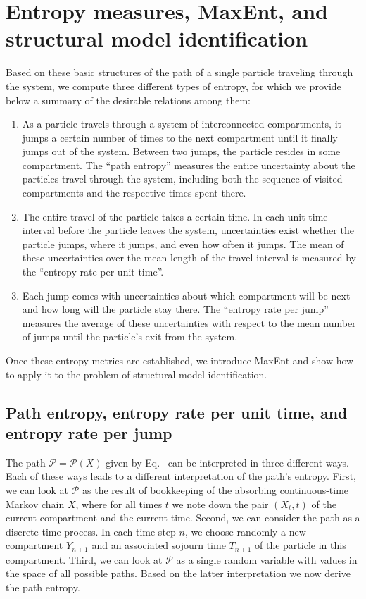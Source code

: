 \documentclass[smallextended]{svjour3}
\makeatletter
\renewcommand*{\eqref}[1]{%
  \hyperref[{#1}]{\textup{\tagform@{\ref*{#1}}}}%
}
\renewcommand{\emph}[1]{``#1''}
\makeatother
\begin{document}
\section{Entropy measures, MaxEnt, and structural model identification}
Based on these basic structures of the path of a single particle traveling through the system, we compute three different types of entropy, for which we provide below
a summary of the desirable relations among them:
\begin{enumerate}[(1)]
  \item 	As a particle travels through a system of interconnected compartments, it jumps a certain number of times to the next compartment until it finally jumps out of the system.
	Between two jumps, the particle resides in some compartment.
  The \emph{path entropy} measures the entire uncertainty about the particles travel through the system, including both the sequence of visited compartments and the respective times spent there.

	\item The entire travel of the particle takes a certain time.
	In each unit time interval before the particle leaves the system, uncertainties exist whether the particle jumps, where it jumps, and even how often it jumps.
	The mean of these uncertainties over the mean length of the travel interval is measured by the \emph{entropy rate per unit time}.

	\item Each jump comes with uncertainties about which compartment will be next and how long will the particle stay there.
	The \emph{entropy rate per jump} measures the average of these uncertainties with respect to the mean number of jumps until the particle's exit from the system.
\end{enumerate}

Once these entropy metrics are established, we introduce MaxEnt and show how to apply it to the problem of structural model identification.


\subsection{Path entropy, entropy rate per unit time, and entropy rate per jump}
\label{sec:path_entropy}
The path $\mathcal{P}=\mathcal{P}(X)$ given by Eq.~\eqref{eqn:path} can be interpreted in three different ways.
Each of these ways leads to a different interpretation of the path's entropy.
First, we can look at $\mathcal{P}$ as the result of bookkeeping of the absorbing continuous-time Markov chain $X$, where for all times $t$ we note down the pair $(X_t,t)$ of the current compartment and the current time.
Second, we can consider the path as a discrete-time process.
In each time step $n$, we choose randomly a new compartment $Y_{n+1}$ and an associated sojourn time $T_{n+1}$ of the particle in this compartment.
Third, we can look at $\mathcal{P}$ as a single random variable with values in the space of all possible paths.
Based on the latter interpretation we now derive the path entropy.
\end{document}
